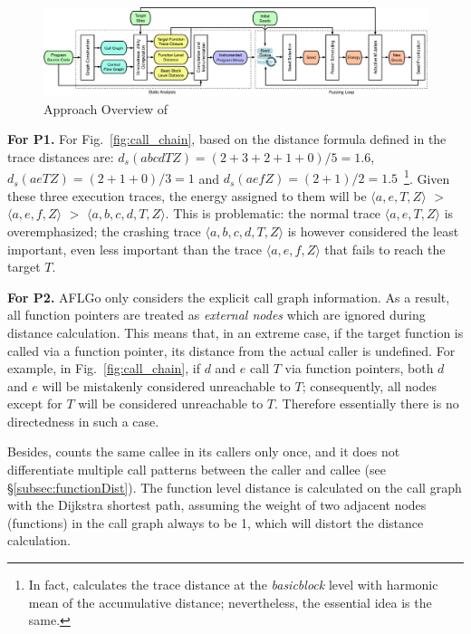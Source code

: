 \begin{figure}[ht]
	\includegraphics[width=.99\columnwidth]{res/dfot/overview.pdf}
	\caption{Approach Overview of \dFOT}
	\label{fig:overview}
\end{figure}

\textbf{For P1.} 
For Fig.~\ref{fig:call_chain}, based on the distance formula defined in \aflgo
the trace distances are:  $d_s(abcdTZ)=(2+3+2+1+0)/5=1.6$, $d_s(aeTZ)=(2+1+0)/3=1$ and $d_s(aefZ)=(2+1)/2=1.5$~\footnote{In fact, \aflgo calculates the trace distance at the \emph{basicblock} level with harmonic mean of the accumulative distance; nevertheless, the essential idea is the same.}. 
Given these three execution traces, the energy assigned to them will be $ \langle a, e, T, Z\rangle$ $>$ $\langle a, e, f , Z\rangle$ $>$ $\langle a, b, c, d, T, Z\rangle$.
This is problematic: the normal trace $\langle a, e, T, Z\rangle $ is overemphasized; the crashing trace $\langle a, b, c, d, T, Z\rangle$ is however considered the least important, even less important than the trace $\langle a, e, f , Z\rangle$ that fails to reach the target $T$.



\textbf{For P2.} AFLGo only considers the explicit call graph information.
As a result, all function pointers are treated as \emph{external nodes} which 
are ignored during distance calculation. 
This means that, in an extreme case, if the target function is called via a function pointer, its distance from the actual caller is undefined. 
For example, in Fig.~\ref{fig:call_chain}, if $d$ and $e$ call $T$ via function pointers, both $d$ and $e$ will be mistakenly considered unreachable to $T$; consequently, all nodes except for $T$ will be considered unreachable to $T$. Therefore essentially there is no directedness in such a case.


Besides, \aflgo counts the same callee in its callers only once, and it does not differentiate multiple call patterns between the caller and callee (see \S\ref{subsec:functionDist}).
The function level distance is calculated on the call graph with the Dijkstra shortest path, assuming the weight of two adjacent nodes (functions) in the call graph always to be 1, which will distort the distance calculation. 


